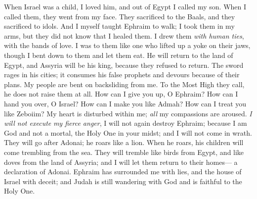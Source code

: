 \begin{biblechapter} %
 When Israel was a child, I loved him, 
and out of Egypt I called my son.
\verse When I called them, they went from my face. 
They sacrificed to the Baals, and they sacrificed to idols.
\verse And I myself taught Ephraim to walk; 
I took them in my arms, 
but they did not know that I healed them.
\verse I drew them \textit{with human ties}, 
with the bands of love. 
I was to them like one who lifted up a yoke on their jaws, 
though I bent down to them and let them eat.
\verse He will return to the land of Egypt, 
and Assyria will be his king, 
because they refused to return.
\verse The sword rages in his cities; 
it consumes his false prophets 
and devours because of their plans.
\verse My people are bent on backsliding from me. 
To the Most High they call, 
he does not raise them at all.
\verse How can I give you up, O Ephraim? 
How can I hand you over, O Israel? 
How can I make you like Admah? 
How can I treat you like Zeboiim? 
My heart is disturbed within me; 
\textit{all} my compassions are aroused.
\verse \textit{I will not execute} \textit{my fierce anger}, 
I will not again destroy Ephraim; 
because I am God 
and not a mortal, 
the Holy One in your midst; 
and I will not come in wrath.
\verse They will go after Adonai; 
he roars like a lion. 
When he roars, 
his children will come trembling 
from the sea.
\verse They will tremble like birds from Egypt, 
and like doves from the land of Assyria; 
and I will let them return to their homes— 
a declaration of Adonai.
  Ephraim has surrounded me with lies, 
and the house of Israel with deceit; 
and Judah is still wandering with God 
and is faithful to the Holy One.
\end{biblechapter}

